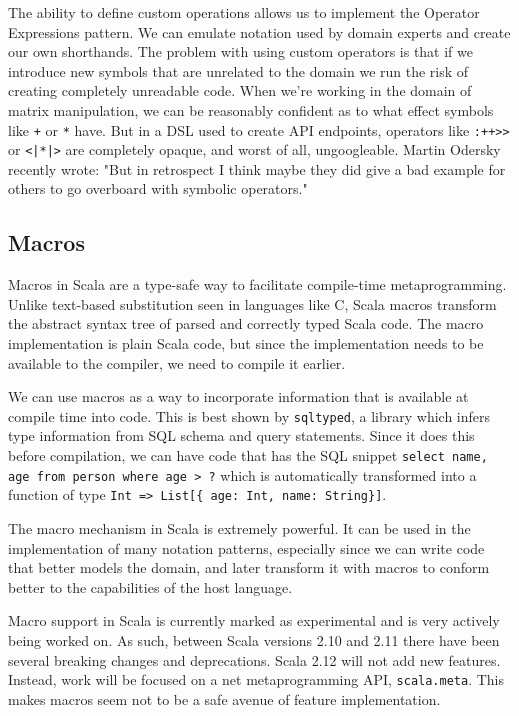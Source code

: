 The ability to define custom operations allows us to implement the Operator Expressions pattern.
We can emulate notation used by domain experts and create our own shorthands.
The problem with using custom operators is that if we introduce new symbols that are unrelated to the domain we run the risk of creating completely unreadable code.
When we're working in the domain of matrix manipulation, we can be reasonably confident as to what effect symbols like \texttt{+} or \texttt{*} have.
But in a DSL used to create API endpoints, operators like \texttt{:++>>} or \texttt{<|*|>} are completely opaque, and worst of all, ungoogleable.
Martin Odersky recently wrote: "But in retrospect I think maybe they did give a bad example for others to go overboard with symbolic operators." \autocite{Odersky:2016}


\subsection{Macros}

Macros in Scala are a type-safe way to facilitate compile-time metaprogramming.
Unlike text-based substitution seen in languages like C, Scala macros transform the abstract syntax tree of parsed and correctly typed Scala code.
The macro implementation is plain Scala code, but since the implementation needs to be available to the compiler, we need to compile it earlier.

We can use macros as a way to incorporate information that is available at compile time into code.
This is best shown by \texttt{sqltyped}, a library which infers type information from SQL schema and query statements.
Since it does this before compilation, we can have code that has the SQL snippet \texttt{select name, age from person where age > ?} which is automatically transformed into a function of type \texttt{Int => List[\{ age: Int, name: String\}]}.

The macro mechanism in Scala is extremely powerful.
It can be used in the implementation of many notation patterns, especially since we can write code that better models the domain, and later transform it with macros to conform better to the capabilities of the host language.

Macro support in Scala is currently marked as experimental and is very actively being worked on.
As such, between Scala versions 2.10 and 2.11 there have been several breaking changes and deprecations.
Scala 2.12 will not add new features.
Instead, work will be focused on a net metaprogramming API, \texttt{scala.meta}.
This makes macros seem not to be a safe avenue of feature implementation.

